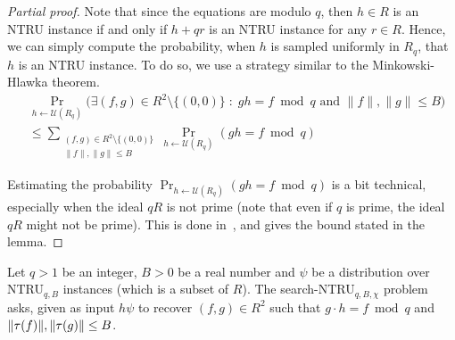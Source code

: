 \begin{proof}[Partial proof]
Note that since the equations are modulo $q$, then $h \in R$ is an NTRU instance if and only if $h + qr$ is an NTRU instance for any $r \in R$. Hence, we can simply compute the probability, when $h$ is sampled uniformly in $R_q$, that $h$ is an NTRU instance.
To do so, we use a strategy similar to the Minkowski-Hlawka theorem.
\begin{align*}
&\Pr_{h \leftarrow \mathcal{U}(R_q)} \Big(\exists (f,g) \in R^2\setminus\{(0,0)\} \; : \; gh = f \bmod q \text{ and } \|f\|, \|g\| \leq B \Big) \\
&\leq \sum_{\substack{(f,g) \in R^2\setminus\{(0,0)\} \\ \|f\|, \|g\| \leq B}} \Pr_{h \leftarrow \mathcal{U}(R_q)}(gh = f \bmod q)
\end{align*}

Estimating the probability $\Pr_{h \leftarrow \mathcal{U}(R_q)}(gh = f \bmod q)$ is a bit technical, especially when the ideal $qR$ is not prime (note that even if $q$ is prime, the ideal $qR$ might not be prime). This is done in~\cite[Lemma B.1]{PS21}, and gives the bound stated in the lemma.


\end{proof}

\begin{definition}
Let $q >1$ be an integer, $B >0$ be a real number and $\psi$ be a distribution over NTRU$_{q,B}$ instances (which is a subset of $R$).
The search-NTRU$_{q, B, \chi}$ problem asks, given as input $h \psi$ to recover $(f, g) \in R^2$ such that $g \cdot h = f \bmod q$ and $\|\tau(f)\|, \|\tau(g)\| \leq B$.
\end{definition}

